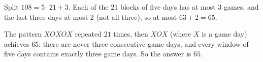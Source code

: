 Split $108=5\cdot21+3$. Each of the $21$ blocks of five days has at most $3$ games, and the last three days at most $2$ (not all three), so at most $63+2=65$.

The pattern $XOXOX$ repeated $21$ times, then $XOX$ (where $X$ is a game day) achieves $65$: there are never three consecutive game days, and every window of five days contains exactly three game days. So the answer is $\boxed{65}$.
